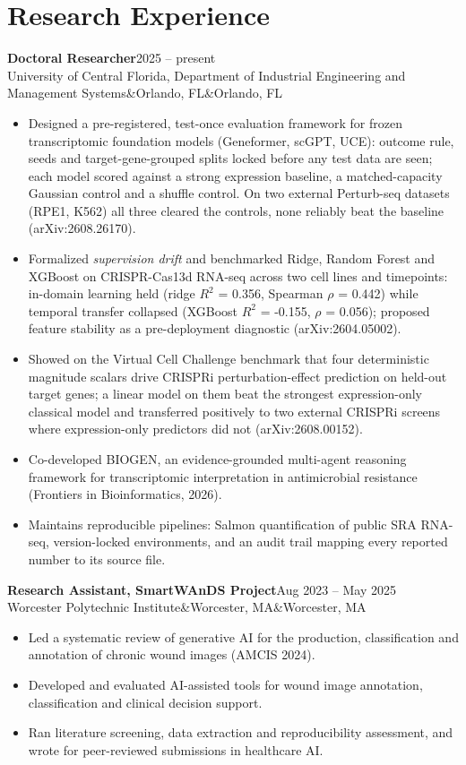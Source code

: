 \documentclass[10pt,letterpaper]{article}
\newcommand{\entry}[4]{%
  {\bfseries #1}\hfill{\color{muted}#2}\\
  {#3}\ifx&#4&\else\hfill{\color{muted}#4}\fi\par\vspace{1pt}}
\begin{document}
\section{Research Experience}
\entry{Doctoral Researcher}{2025 -- present}{University of Central Florida, Department of Industrial Engineering and Management Systems}{Orlando, FL}
\begin{itemize}
  \item Designed a pre-registered, test-once evaluation framework for frozen transcriptomic foundation models (Geneformer, scGPT, UCE): outcome rule, seeds and target-gene-grouped splits locked before any test data are seen; each model scored against a strong expression baseline, a matched-capacity Gaussian control and a shuffle control. On two external Perturb-seq datasets (RPE1, K562) all three cleared the controls, none reliably beat the baseline (arXiv:2608.26170).
  \item Formalized \emph{supervision drift} and benchmarked Ridge, Random Forest and XGBoost on CRISPR-Cas13d RNA-seq across two cell lines and timepoints: in-domain learning held (ridge $R^2$ = 0.356, Spearman $\rho$ = 0.442) while temporal transfer collapsed (XGBoost $R^2$ = -0.155, $\rho$ = 0.056); proposed feature stability as a pre-deployment diagnostic (arXiv:2604.05002).
  \item Showed on the Virtual Cell Challenge benchmark that four deterministic magnitude scalars drive CRISPRi perturbation-effect prediction on held-out target genes; a linear model on them beat the strongest expression-only classical model and transferred positively to two external CRISPRi screens where expression-only predictors did not (arXiv:2608.00152).
  \item Co-developed BIOGEN, an evidence-grounded multi-agent reasoning framework for transcriptomic interpretation in antimicrobial resistance (Frontiers in Bioinformatics, 2026).
  \item Maintains reproducible pipelines: Salmon quantification of public SRA RNA-seq, version-locked environments, and an audit trail mapping every reported number to its source file.
\end{itemize}
\vspace{3pt}
\entry{Research Assistant, SmartWAnDS Project}{Aug 2023 -- May 2025}{Worcester Polytechnic Institute}{Worcester, MA}
\begin{itemize}
  \item Led a systematic review of generative AI for the production, classification and annotation of chronic wound images (AMCIS 2024).
  \item Developed and evaluated AI-assisted tools for wound image annotation, classification and clinical decision support.
  \item Ran literature screening, data extraction and reproducibility assessment, and wrote for peer-reviewed submissions in healthcare AI.
\end{itemize}
\end{document}
